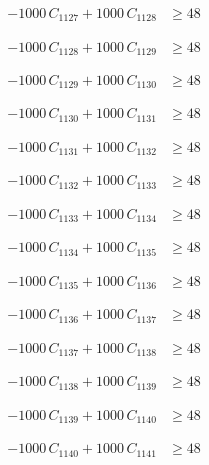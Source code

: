 \documentclass[a4paper,11pt]{article}
\begin{document}
\begin{align}
-1000\,C_{1127} + 1000\,C_{1128} &\geq 48 \nonumber
\end{align}

\begin{align}
-1000\,C_{1128} + 1000\,C_{1129} &\geq 48 \nonumber
\end{align}

\begin{align}
-1000\,C_{1129} + 1000\,C_{1130} &\geq 48 \nonumber
\end{align}

\begin{align}
-1000\,C_{1130} + 1000\,C_{1131} &\geq 48 \nonumber
\end{align}

\begin{align}
-1000\,C_{1131} + 1000\,C_{1132} &\geq 48 \nonumber
\end{align}

\begin{align}
-1000\,C_{1132} + 1000\,C_{1133} &\geq 48 \nonumber
\end{align}

\begin{align}
-1000\,C_{1133} + 1000\,C_{1134} &\geq 48 \nonumber
\end{align}

\begin{align}
-1000\,C_{1134} + 1000\,C_{1135} &\geq 48 \nonumber
\end{align}

\begin{align}
-1000\,C_{1135} + 1000\,C_{1136} &\geq 48 \nonumber
\end{align}

\begin{align}
-1000\,C_{1136} + 1000\,C_{1137} &\geq 48 \nonumber
\end{align}

\begin{align}
-1000\,C_{1137} + 1000\,C_{1138} &\geq 48 \nonumber
\end{align}

\begin{align}
-1000\,C_{1138} + 1000\,C_{1139} &\geq 48 \nonumber
\end{align}

\begin{align}
-1000\,C_{1139} + 1000\,C_{1140} &\geq 48 \nonumber
\end{align}

\begin{align}
-1000\,C_{1140} + 1000\,C_{1141} &\geq 48 \nonumber
\end{align}
\end{document}

